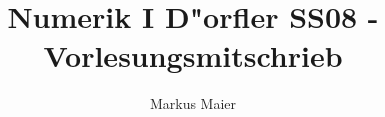 \documentclass{scrartcl}
\begin{document}
\newenvironment{aaufz}
               {\renewcommand{\labelenumi}{\alph{enumi})}
                \renewcommand{\labelenumii}{\alph{enumii})}
                \begin{enumerate}}
               {\end{enumerate}}

\newenvironment{iaufz}
               {\renewcommand{\labelenumi}{(\roman{enumi})}
                \renewcommand{\labelenumii}{(\roman{enumii})}
                \begin{enumerate}}
               {\end{enumerate}}
\newenvironment{1aufz}
               {\renewcommand{\labelenumi}{\arabic{enumi}.)}
                \renewcommand{\labelenumii}{\arabic{enumii}.)}
                \begin{enumerate}}
               {\end{enumerate}}

\newcommand{\RR}{\mathbb{R}}
\newcommand{\CC}{\mathbb{C}}
\newcommand{\NN}{\mathbb{N}}
\newcommand{\FF}{\mathbb{F}}
\newcommand{\PP}{\mathbb{P}}
\newcommand{\ZZ}{\mathbb{Z}}
\newcommand{\LL}{\mathbb{L}}
\newcommand{\rd}{\mathrm{rd}}
\newcommand{\Vvert}{\vert \hspace{-0.7pt} \vert \hspace{-0.7pt} \vert}
\newcommand{\supp}{\mathrm{supp} \,}
\newcommand{\gradient}{\mathrm{grad} \, }
\newcommand{\divergenz}{\mathrm{div} \, }
\newcommand{\tridiag}{\mathrm{tridiag}}
\newcommand{\diag}{\mathrm{diag}}
\newcommand{\cond}{\mathrm{cond}}
\newcommand{\Bild}{\mathrm{Bild}}
\newcommand{\Rang}{\mathrm{Rang}}
\newcommand{\spann}{\mathrm{span}}
\newcommand{\spec}{\mathrm{spec}}
\newcommand{\compl}{\mathrm{compl}}
\newcommand{\Tol}{\mathrm{Tol}}
\renewcommand{\d}{\, \mathrm{d}}
\renewcommand{\O}{\mathcal{O}}
\newcommand{\subsubsub}[1]{\paragraph*{#1} \ }

\newtheorem{Lemma}{Lemma}
\newtheorem{Thm}{Theorem}
\newtheorem{Satz}{Satz}
\newtheorem*{Beweis}{Beweis}
\newtheorem*{Def}{Definition}


\newenvironment{Bew}{\begin{Beweis}}{\qed \end{Beweis}}

\title{Numerik I D"orfler SS08 - Vorlesungsmitschrieb}
\author{Markus Maier}
\date{}
\maketitle
\end{document}
